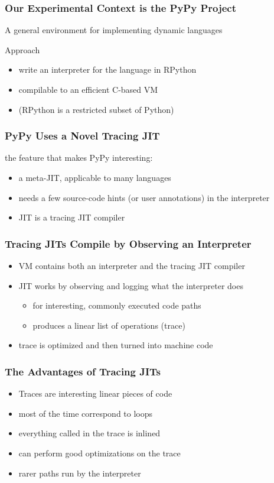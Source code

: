 \documentclass[utf8x]{beamer}
\begin{document}
\begin{frame}
  \frametitle{Our Experimental Context is the PyPy Project}
  A general environment for implementing dynamic languages
  \pause
  \begin{block}{Approach}
      \begin{itemize}
          \item write an interpreter for the language in RPython
          \item compilable to an efficient C-based VM
          \pause
          \item (RPython is a restricted subset of Python)
      \end{itemize}
  \end{block}
\end{frame}

\begin{frame}
  \frametitle{PyPy Uses a Novel Tracing JIT}
  the feature that makes PyPy interesting:
  \begin{itemize}
      \item a meta-JIT, applicable to many languages
      \item needs a few source-code hints (or user annotations) in the interpreter
      \item JIT is a tracing JIT compiler
  \end{itemize}
\end{frame}

\begin{frame}
  \frametitle{Tracing JITs Compile by Observing an Interpreter}
  \begin{itemize}
      \item VM contains both an interpreter and the tracing JIT compiler
      \item JIT works by observing and logging what the interpreter does
      \begin{itemize}
          \item for interesting, commonly executed code paths
          \item produces a linear list of operations (trace)
      \end{itemize}
      \item trace is optimized and then turned into machine code
  \end{itemize}
\end{frame}

\begin{frame}
  \frametitle{The Advantages of Tracing JITs}
  \begin{itemize}
      \item Traces are interesting linear pieces of code
      \item most of the time correspond to loops
      \item everything called in the trace is inlined
      \item can perform good optimizations on the trace
      \item rarer paths run by the interpreter
  \end{itemize}
\end{frame}
\end{document}
